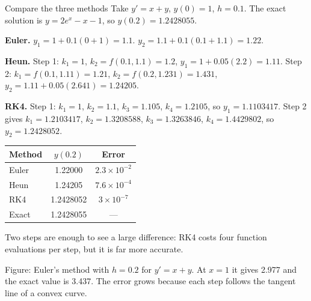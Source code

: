 \begin{examplebox}{Compare the three methods}
Take $y' = x + y$, $y(0)=1$, $h = 0.1$. The exact solution is $y = 2e^{x} - x - 1$, so $y(0.2) = 1.2428055$.

\textbf{Euler.} $y_1 = 1 + 0.1(0 + 1) = 1.1$. $y_2 = 1.1 + 0.1(0.1 + 1.1) = 1.22$.

\textbf{Heun.} Step 1: $k_1 = 1$, $k_2 = f(0.1, 1.1) = 1.2$, $y_1 = 1 + 0.05(2.2) = 1.11$. Step 2: $k_1 = f(0.1, 1.11) = 1.21$, $k_2 = f(0.2, 1.231) = 1.431$, $y_2 = 1.11 + 0.05(2.641) = 1.24205$.

\textbf{RK4.} Step 1: $k_1 = 1$, $k_2 = 1.1$, $k_3 = 1.105$, $k_4 = 1.2105$, so $y_1 = 1.1103417$. Step 2 gives $k_1 = 1.2103417$, $k_2 = 1.3208588$, $k_3 = 1.3263846$, $k_4 = 1.4429802$, so $y_2 = 1.2428052$.

\begin{center}
\begin{tabular}{@{}lcc@{}}
\toprule
Method & $y(0.2)$ & Error \\
\midrule
Euler & 1.22000 & $2.3\times10^{-2}$ \\
Heun & 1.24205 & $7.6\times10^{-4}$ \\
RK4 & 1.2428052 & $3\times10^{-7}$ \\
Exact & 1.2428055 & --- \\
\bottomrule
\end{tabular}
\end{center}
Two steps are enough to see a large difference: RK4 costs four function evaluations per step, but it is far more accurate.
\end{examplebox}

\begin{center}

{\small Figure: Euler's method with $h=0.2$ for $y'=x+y$. At $x=1$ it gives 2.977 and the exact value is 3.437. The error grows because each step follows the tangent line of a convex curve.}
\end{center}


